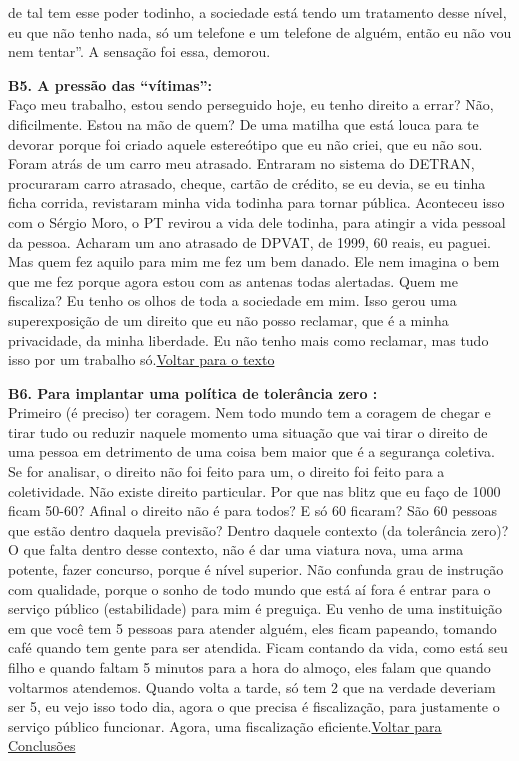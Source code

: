 \documentclass[
	12pt,				%
	openright,			%
	twoside,			%
	a4paper,			%
	chapter=TITLE,		%
	section=TITLE,		%
	subsection=TITLE,	%
	subsubsection=TITLE,%
	spanish,            %
	english,			%
	brazil				%
	]{abntex2}
\begin{document}
\begin{anexosenv}
de tal tem esse poder todinho, a sociedade está tendo um tratamento desse nível, eu que não tenho nada, só um telefone e um telefone de alguém, então eu não vou nem tentar”. A sensação foi essa, demorou.
	\hypertarget{B5}{}
	\par
	\textbf{B5. A pressão das “vítimas”:} \\
	Faço meu trabalho, estou sendo perseguido hoje, eu tenho direito a errar? Não, dificilmente. Estou na mão de quem? De uma matilha que está louca para te devorar porque foi criado aquele estereótipo que eu não criei, que eu não sou. Foram atrás de um carro meu atrasado. Entraram no sistema do DETRAN, procuraram carro atrasado, cheque, cartão de crédito, se eu devia, se eu tinha ficha corrida, revistaram minha vida todinha para tornar pública. Aconteceu isso com o Sérgio Moro, o PT revirou a vida dele todinha, para atingir a vida pessoal da pessoa. Acharam um ano atrasado de DPVAT, de 1999, 60 reais, eu paguei. Mas quem fez aquilo para mim me fez um bem danado. Ele nem imagina o bem que me fez porque agora estou com as antenas todas alertadas.	Quem me fiscaliza? Eu tenho os olhos de toda a sociedade em mim. Isso gerou uma superexposição de um direito que eu não posso reclamar,  que é a minha privacidade, da minha liberdade. Eu não tenho mais como reclamar, mas tudo isso por um trabalho só.\hyperlink{Sty1}{Voltar para o texto}
	\hypertarget{B6}{}
	\par
	\textbf{B6. Para implantar uma política de tolerância zero :} \\
	Primeiro (é preciso) ter coragem. Nem todo mundo tem a coragem de chegar e tirar tudo ou reduzir naquele momento uma situação que vai tirar o direito de uma pessoa em detrimento de uma coisa bem maior que é a segurança coletiva. Se for analisar, o direito não foi feito para um, o direito foi feito para a coletividade. Não existe direito particular. Por que nas blitz que eu faço  de 1000 ficam 50-60? Afinal o direito não é para todos? E só 60 ficaram? São 60 pessoas que estão dentro daquela previsão? Dentro daquele contexto (da tolerância zero)? O que falta dentro desse contexto, não é dar uma viatura nova, uma arma potente, fazer concurso, porque é nível superior.  Não confunda grau de instrução com qualidade, porque o sonho de todo mundo que está aí fora é entrar para o serviço público (estabilidade) para mim é preguiça. Eu venho de uma instituição em que você tem 5 pessoas para atender alguém, eles ficam papeando, tomando café quando tem gente para ser atendida. Ficam contando da vida, como está seu filho e quando faltam 5 minutos para a hora do almoço, eles falam que quando voltarmos atendemos. Quando volta a tarde, só tem 2 que na verdade deveriam ser 5, eu vejo isso todo dia, agora o que precisa é fiscalização, para justamente o serviço público funcionar. Agora, uma fiscalização eficiente.\hyperlink{T0}{Voltar para Conclusões}

\end{anexosenv}
\end{document}
